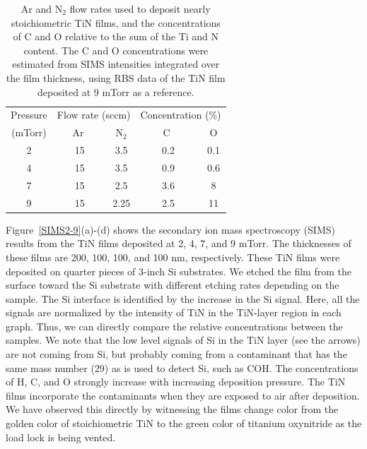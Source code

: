 \begin{table}
 \centering
\caption{Ar and N$_{2}$ flow rates used to deposit nearly stoichiometric TiN films, and the concentrations of C and O relative to the sum of the Ti and N content. The C and O concentrations were estimated from SIMS intensities integrated over the film thickness, using RBS data of the TiN film deposited at  9 mTorr as a reference.}
\begin{tabular}{|c|c|c||c|c|}
\hline
\hline
Pressure & \multicolumn{2}{|c||}{Flow rate (sccm)} & \multicolumn{2}{|c|}{Concentration (\%)} \\
\cline{2-5}
 (mTorr) & \ \ \ Ar \ \ \ & N$_{2}$ & \ \ \ \ C \ \ \ \ & O \\
\hline
\hline
2 & 15 & 3.5 & 0.2 & 0.1 \\
\hline
4 & 15 & 3.5 & 0.9 & 0.6 \\
\hline
7 & 15 & 2.5 & 3.6 & 8 \\
\hline
9 & 15 & 2.25 & 2.5 & 11 \\
\hline
\hline
\end{tabular}
\label{TabContaminations}
\end{table}

Figure \,\ref{SIMS2-9}(a)-(d) shows the secondary ion mass spectroscopy (SIMS) results from the TiN films deposited at 2, 4, 7, and 9 mTorr. The thicknesses of these films are 200, 100, 100, and 100 nm, respectively. These TiN films were deposited on quarter pieces of 3-inch Si substrates. We etched the film from the surface toward the Si substrate with different etching rates depending on the sample. The Si interface is identified by the increase in the Si signal. Here, all the signals are normalized by the intensity of TiN in the TiN-layer region in each graph. Thus, we can directly compare the relative concentrations between the samples. We note that the low level signals of Si in the TiN layer (see the arrows) are not coming from Si, but probably coming from a contaminant that has the same mass number (29) as is used to detect Si, such as COH. The concentrations of H, C, and O strongly increase with increasing deposition pressure. The TiN films incorporate the contaminants when they are exposed to air after deposition.\cite{Logothetidis1999} We have observed this directly by witnessing the films change color from the golden color of stoichiometric TiN to the green color of titanium oxynitride as the load lock is being vented. 

